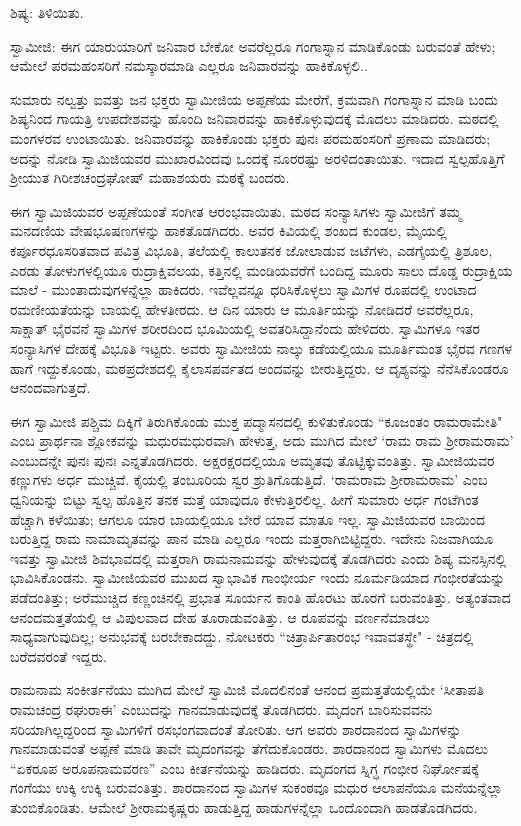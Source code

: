 ಶಿಷ್ಯ: ತಿಳಿಯಿತು.

ಸ್ವಾಮೀಜಿ: ಈಗ ಯಾರುಯಾರಿಗೆ ಜನಿವಾರ ಬೇಕೋ ಅವರೆಲ್ಲರೂ ಗಂಗಾಸ್ನಾನ ಮಾಡಿಕೊಂಡು ಬರುವಂತೆ ಹೇಳು; ಆಮೇಲೆ ಪರಮಹಂಸರಿಗೆ ನಮಸ್ಕಾರಮಾಡಿ ಎಲ್ಲರೂ ಜನಿವಾರವನ್ನು ಹಾಕಿಕೊಳ್ಳಲಿ..

ಸುಮಾರು ನಲ್ವತ್ತು ಐವತ್ತು ಜನ ಭಕ್ತರು ಸ್ವಾಮೀಜಿಯ ಅಪ್ಪಣೆಯ ಮೇರೆಗೆ, ಕ್ರಮವಾಗಿ ಗಂಗಾಸ್ನಾನ ಮಾಡಿ ಬಂದು ಶಿಷ್ಯನಿಂದ ಗಾಯತ್ರಿ ಉಪದೇಶವನ್ನು ಹೊಂದಿ ಜನಿವಾರವನ್ನು ಹಾಕಿಕೊಳ್ಳುವುದಕ್ಕೆ ಮೊದಲು ಮಾಡಿದರು. ಮಠದಲ್ಲಿ ಮಂಗಳರವ ಉಂಟಾಯಿತು. ಜನಿವಾರವನ್ನು ಹಾಕಿಕೊಂಡು ಭಕ್ತರು ಪುನಃ ಪರಮಹಂಸರಿಗೆ ಪ್ರಣಾಮ ಮಾಡಿದರು; ಅದನ್ನು ನೋಡಿ ಸ್ವಾಮಿಜಿಯವರ ಮುಖಾರವಿಂದವು ಒಂದಕ್ಕೆ ನೂರರಷ್ಟು ಅರಳಿದಂತಾಯಿತು. ಇದಾದ ಸ್ವಲ್ಪಹೊತ್ತಿಗೆ ಶ‍್ರೀಯುತ ಗಿರೀಶಚಂದ್ರಘೋಷ್ ಮಹಾಶಯರು ಮಠಕ್ಕೆ ಬಂದರು.

ಈಗ ಸ್ವಾಮಿಜಿಯವರ ಅಪ್ಪಣೆಯಂತೆ ಸಂಗೀತ ಆರಂಭವಾಯಿತು. ಮಠದ ಸಂನ್ಯಾಸಿಗಳು ಸ್ವಾಮೀಜಿಗೆ ತಮ್ಮ ಮನದಣಿಯ ವೇಷಭೂಷಣಗಳನ್ನು ಹಾಕತೊಡಗಿದರು. ಅವರ ಕಿವಿಯಲ್ಲಿ ಶಂಖದ ಕುಂಡಲ, ಮೈಯಲ್ಲಿ ಕರ್ಪೂರಧೂಸರಿತವಾದ ಪವಿತ್ರ ವಿಭೂತಿ, ತಲೆಯಲ್ಲಿ ಕಾಲುತನಕ ಜೋಲಾಡುವ ಜಟೆಗಳು, ಎಡಗೈಯಲ್ಲಿ ತ್ರಿಶೂಲ, ಎರಡು ತೋಳುಗಳಲ್ಲಿಯೂ ರುದ್ರಾಕ್ಷಿವಲಯ, ಕತ್ತಿನಲ್ಲಿ ಮಂಡಿಯವರೆಗೆ ಬಂದಿದ್ದ ಮೂರು ಸಾಲು ದೊಡ್ಡ ರುದ್ರಾಕ್ಷಿಯ ಮಾಲೆ - ಮುಂತಾದುವುಗಳನ್ನೆಲ್ಲಾ ಹಾಕಿದರು. ಇವೆಲ್ಲವನ್ನೂ ಧರಿಸಿಕೊಳ್ಳಲು ಸ್ವಾಮಿಗಳ ರೂಪದಲ್ಲಿ ಉಂಟಾದ ರಮಣೀಯತೆಯನ್ನು ಬಾಯಲ್ಲಿ ಹೇಳತೀರದು. ಆ ದಿನ ಯಾರು ಆ ಮೂರ್ತಿಯನ್ನು ನೋಡಿದರೆ ಅವರೆಲ್ಲರೂ, ಸಾಕ್ಷಾತ್ ಭೈರವನೆ ಸ್ವಾಮಿಗಳ ಶರೀರದಿಂದ ಭೂಮಿಯಲ್ಲಿ ಅವತರಿಸಿದ್ದಾನೆಂದು ಹೇಳಿದರು. ಸ್ವಾಮಿಗಳೂ ಇತರ ಸಂನ್ಯಾಸಿಗಳ ದೇಹಕ್ಕೆ ವಿಭೂತಿ ಇಟ್ಟರು. ಅವರು ಸ್ವಾಮೀಜಿಯ ನಾಲ್ಕು ಕಡೆಯಲ್ಲಿಯೂ ಮೂರ್ತಿಮಂತ ಭೈರವ ಗಣಗಳ ಹಾಗೆ ಇದ್ದುಕೊಂಡು, ಮಠಪ್ರದೇಶದಲ್ಲಿ ಕೈಲಾಸಪರ್ವತದ ಅಂದವನ್ನು ಬೀರುತ್ತಿದ್ದರು. ಆ ದೃಶ್ಯವನ್ನು ನೆನೆಸಿಕೊಂಡರೂ ಆನಂದವಾಗುತ್ತದೆ.

ಈಗ ಸ್ವಾಮೀಜಿ ಪಶ್ಚಿಮ ದಿಕ್ಕಿಗೆ ತಿರುಗಿಕೊಂಡು ಮುಕ್ತ ಪದ್ಮಾಸನದಲ್ಲಿ ಕುಳಿತುಕೊಂಡು “ಕೂಜಂತಂ ರಾಮರಾಮೇತಿ" ಎಂಬ ಪ್ರಾರ್ಥನಾ ಶ್ಲೋಕವನ್ನು ಮಧುರಮಧುರವಾಗಿ ಹೇಳುತ್ತ, ಅದು ಮುಗಿದ ಮೇಲೆ ‘ರಾಮ ರಾಮ ಶ‍್ರೀರಾಮರಾಮ’ ಎಂಬುದನ್ನೇ ಪುನಃ ಪುನಃ ಎನ್ನತೊಡಗಿದರು. ಅಕ್ಷರಕ್ಷರದಲ್ಲಿಯೂ ಅಮೃತವು ತೊಟ್ಟಿಕ್ಕುವಂತಿತ್ತು. ಸ್ವಾಮೀಜಿಯವರ ಕಣ್ಣುಗಳು ಅರ್ಧ ಮುಚ್ಚಿವೆ. ಕೈಯಲ್ಲಿ ತಂಬೂರಿಯ ಸ್ವರ ಶ್ರುತಿಗೊಡುತ್ತಿದೆ. ‘ರಾಮರಾಮ ಶ‍್ರೀರಾಮರಾಮ’ ಎಂಬ ಧ್ವನಿಯನ್ನು ಬಿಟ್ಟು ಸ್ವಲ್ಪ ಹೊತ್ತಿನ ತನಕ ಮತ್ತೆ ಯಾವುದೂ ಕೇಳುತ್ತಿರಲಿಲ್ಲ. ಹೀಗೆ ಸುಮಾರು ಅರ್ಧ ಗಂಟೆಗಿಂತ ಹೆಚ್ಚಾಗಿ ಕಳೆಯಿತು; ಆಗಲೂ ಯಾರ ಬಾಯಲ್ಲಿಯೂ ಬೇರೆ ಯಾವ ಮಾತೂ ಇಲ್ಲ. ಸ್ವಾಮಿಜಿಯವರ ಬಾಯಿಂದ ಬರುತ್ತಿದ್ದ ರಾಮ ನಾಮಾಮೃತವನ್ನು ಪಾನ ಮಾಡಿ ಎಲ್ಲರೂ ಇಂದು ಮತ್ತರಾಗಿಬಿಟ್ಟಿದ್ದರು. ಇದೇನು ನಿಜವಾಗಿಯೂ ಇವತ್ತು ಸ್ವಾಮೀಜಿ ಶಿವಭಾವದಲ್ಲಿ ಮತ್ತರಾಗಿ ರಾಮನಾಮವನ್ನು ಹೇಳುವುದಕ್ಕೆ ತೊಡಗಿದರು ಎಂದು ಶಿಷ್ಯ ಮನಸ್ಸಿನಲ್ಲಿ ಭಾವಿಸಿಕೊಂಡನು. ಸ್ವಾಮೀಜಿಯವರ ಮುಖದ ಸ್ವಾಭಾವಿಕ ಗಾಂಭೀರ್ಯ ಇಂದು ನೂರ್ಮಡಿಯಾದ ಗಂಭೀರತೆಯನ್ನು ಪಡೆದಂತಿತ್ತು; ಅರೆಮುಚ್ಚಿದ ಕಣ್ಣಂಚಿನಲ್ಲಿ ಪ್ರಭಾತ ಸೂರ್ಯನ ಕಾಂತಿ ಹೊರಟು ಹೊರಗೆ ಬರುವಂತಿತ್ತು. ಅತ್ಯಂತವಾದ ಆನಂದಮತ್ತತೆಯಲ್ಲಿ ಆ ವಿಪುಲವಾದ ದೇಹ ತೂರಾಡುವಂತಿತ್ತು. ಆ ರೂಪವನ್ನು ವರ್ಣನೆಮಾಡಲು ಸಾಧ್ಯವಾಗುವುದಿಲ್ಲ; ಅನುಭವಕ್ಕೆ ಬರಬೇಕಾದದ್ದು. ನೋಟಕರು “ಚಿತ್ರಾರ್ಪಿತಾರಂಭ ಇವಾವತಸ್ಥೇ" - ಚಿತ್ರದಲ್ಲಿ ಬರೆದವರಂತೆ ಇದ್ದರು.

ರಾಮನಾಮ ಸಂಕೀರ್ತನೆಯು ಮುಗಿದ ಮೇಲೆ ಸ್ವಾಮಿಜಿ ಮೊದಲಿನಂತೆ ಆನಂದ ಪ್ರಮತ್ತತೆಯಲ್ಲಿಯೇ ‘ಸೀತಾಪತಿ ರಾಮಚಂದ್ರ ರಘುರಾಈ’ ಎಂಬುದನ್ನು ಗಾನಮಾಡುವುದಕ್ಕೆ ತೊಡಗಿದರು. ಮೃದಂಗ ಬಾರಿಸುವವನು ಸರಿಯಾಗಿಲ್ಲದ್ದರಿಂದ ಸ್ವಾಮಿಗಳಿಗೆ ರಸಭಂಗವಾದಂತೆ ತೋರಿತು. ಆಗ ಅವರು ಶಾರದಾನಂದ ಸ್ವಾಮಿಗಳನ್ನು ಗಾನಮಾಡುವಂತೆ ಅಪ್ಪಣೆ ಮಾಡಿ ತಾವೇ ಮೃದಂಗವನ್ನು ತೆಗೆದುಕೊಂಡರು. ಶಾರದಾನಂದ ಸ್ವಾಮಿಗಳು ಮೊದಲು “ಏಕರೂಪ ಅರೂಪನಾಮವರಣ” ಎಂಬ ಕೀರ್ತನೆಯನ್ನು ಹಾಡಿದರು. ಮೃದಂಗದ ಸ್ನಿಗ್ಧ ಗಂಭೀರ ನಿರ್ಘೋಷಕ್ಕೆ ಗಂಗೆಯು ಉಕ್ಕಿ ಉಕ್ಕಿ ಬರುವಂತಿತ್ತು. ಶಾರದಾನಂದ ಸ್ವಾಮಿಗಳ ಸುಕಂಠವೂ ಮಧುರ ಆಲಾಪನೆಯೂ ಮನೆಯನ್ನೆಲ್ಲಾ ತುಂಬಿಕೊಂಡಿತು. ಆಮೇಲೆ ಶ‍್ರೀರಾಮಕೃಷ್ಣರು ಹಾಡುತ್ತಿದ್ದ ಹಾಡುಗಳನ್ನೆಲ್ಲಾ ಒಂದೊಂದಾಗಿ ಹಾಡತೊಡಗಿದರು.


